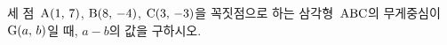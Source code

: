 세 점~$\mathrm{A}(1,\,7)$, $\mathrm{B}(8,\,-4)$, $\mathrm{C}(3,\,-3)$을 꼭짓점으로 하는 삼각형~$\mathrm{ABC}$의 무게중심이 $\mathrm{G}(a,\,b)$일 때, $a-b$의 값을 구하시오.
